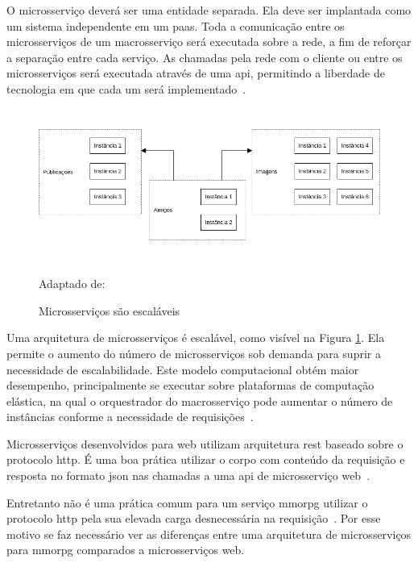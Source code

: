 O microsserviço deverá ser uma entidade separada. Ela deve ser implantada como um sistema independente em um \ac{paas}.
%
Toda a comunicação entre os microsserviços de um macrosserviço será executada sobre a rede, a fim de reforçar a separação entre cada serviço.
%
As chamadas pela rede com o cliente ou entre os microsserviços será executada através de uma \ac{api}, permitindo a liberdade de tecnologia em que cada um será implementado~\cite{Newman2015Feb}.



\begin{figure}[htb!]
\caption{Microsserviços são escaláveis}
\label{fig:microsservicos_escalabilidade}
\includegraphics[height=5cm]{img/cap2/microsservicos_escalabilidade.png}
\centering

Adaptado de:~\cite{Newman2015Feb}
\end{figure}



Uma arquitetura de microsserviços é escalável, como visível na Figura \ref{fig:microsservicos_escalabilidade}.
%
Ela permite o aumento do número de microsserviços sob demanda para suprir a necessidade de escalabilidade.
%
Este modelo computacional obtém maior desempenho, principalmente se executar sobre plataformas de computação elástica, na qual o orquestrador do macrosserviço pode aumentar o número de instâncias conforme a necessidade de requisições~\cite{Nadareishvili2016Aug}.



Microsserviços desenvolvidos para web utilizam arquitetura \ac{rest} baseado sobre o protocolo \ac{http}.
%
É uma boa prática utilizar o corpo com conteúdo da requisição e resposta no formato \ac{json} nas chamadas a uma \ac{api} de microsserviço web~\cite{Nadareishvili2016Aug}.



Entretanto não é uma prática comum para um serviço \ac{mmorpg} utilizar o protocolo \ac{http} pela sua elevada carga desnecessária na requisição~\cite{1417630}.
%
Por esse motivo se faz necessário ver as diferenças entre uma arquitetura de microsserviços para \ac{mmorpg} comparados a microsserviços web.



